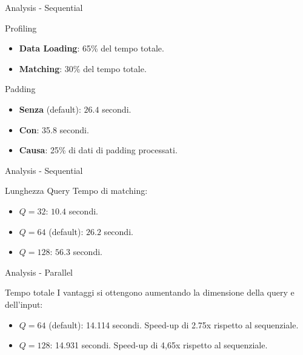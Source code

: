 \begin{frame}{Analysis - Sequential}
    \begin{block}{Profiling}
        \begin{itemize}
            \item \textbf{Data Loading}: 65\% del tempo totale.
            \item \textbf{Matching}: 30\% del tempo totale.
        \end{itemize}
    \end{block}
    \begin{block}{Padding}
        \begin{itemize}
            \item \textbf{Senza} (default): $26.4$ secondi.
            \item \textbf{Con}: 35.8 secondi.
            \item \textbf{Causa}: 25\% di dati di padding processati.
        \end{itemize}
    \end{block}
\end{frame}

\begin{frame}{Analysis - Sequential}
    \begin{block}{Lunghezza Query}
        Tempo di matching:
        \begin{itemize}
            \item \textbf{$Q=32$}: $10.4$ secondi.
            \item \textbf{$Q=64$} (default): $26.2$ secondi.
            \item \textbf{$Q=128$}: $56.3$ secondi.
        \end{itemize}
    \end{block}
\end{frame}

\begin{frame}{Analysis - Parallel}
    \begin{block}{Tempo totale}
        I vantaggi si ottengono aumentando la dimensione della query e dell'input:
        \begin{itemize}
            \item \textbf{$Q=64$} (default): 14.114 secondi. Speed-up di 2.75x rispetto al sequenziale.
            \item \textbf{$Q=128$}: 14.931 secondi. Speed-up di 4,65x rispetto al sequenziale.
        \end{itemize}
    \end{block}
\end{frame}

